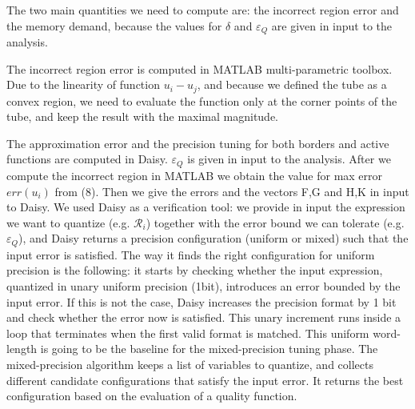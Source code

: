 The two main quantities we need to compute are: the incorrect region error and the memory demand, because the values for $\delta$ and $\varepsilon_{Q}$ are given in input to the analysis.

The incorrect region error is computed in MATLAB multi-parametric toolbox. Due to the linearity of function $u_{i}-u_{j}$, and because we defined the tube as a convex region, we need to evaluate the function only at the corner points of the tube, and keep the result with the maximal magnitude.

The approximation error and the precision tuning for both borders and active functions are computed in Daisy. $\varepsilon_{Q}$ is given in input to the analysis. After we compute the incorrect region in MATLAB we obtain the value for max error $err(u_{i})$ from (8). Then we give the errors and the vectors F,G and H,K in input to Daisy. We used Daisy as a verification tool: we provide in input the expression we want to quantize (e.g. $\mathcal{R}_{i}$) together with the error bound we can tolerate (e.g. $\varepsilon_{Q}$), and Daisy returns a precision configuration (uniform or mixed) such that the input error is satisfied. The way it finds the right configuration for uniform precision is the following: it starts by checking whether the input expression, quantized in unary uniform precision (1bit), introduces an error bounded by the input error. If this is not the case, Daisy increases the precision format by 1 bit and check whether the error now is satisfied. This unary increment runs inside a loop that terminates when the first valid format is matched. This uniform word-length is going to be the baseline for the mixed-precision tuning phase. The mixed-precision algorithm keeps a list of variables to quantize, and collects different candidate configurations that satisfy the input error. It returns the best configuration based on the evaluation of a quality function. 


